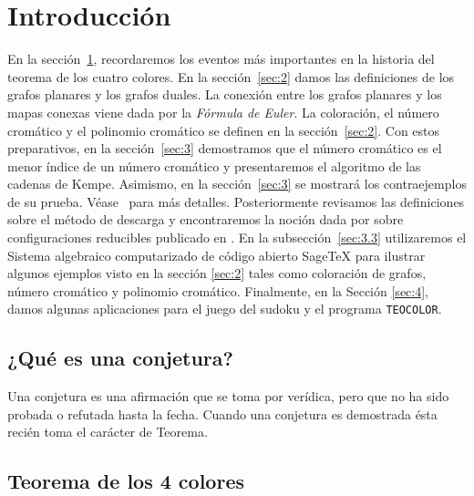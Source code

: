 \documentclass[
	3p,
	times,
	a4paper,
	authoryear
]{elsarticle}%
\begin{document}
\tableofcontents

\section{Introducción}\label{sec:1}

En la sección~\ref{sec:1}, recordaremos los eventos más importantes en la historia del teorema de los cuatro colores. En la sección~\ref{sec:2} damos las definiciones de los grafos planares y los grafos duales. La conexión entre los grafos planares y los mapas conexas viene dada por la \emph{Fórmula de Euler}. La coloración, el número cromático y el polinomio cromático se definen en la sección~\ref{sec:2}. Con estos preparativos, en la sección~\ref{sec:3} demostramos que el número cromático es el menor índice de un número cromático y presentaremos el algoritmo de las cadenas de Kempe. Asimismo, en la sección~\ref{sec:3} se mostrará los contraejemplos de su prueba. Véase~\cite{errera} para más detalles. Posteriormente revisamos las definiciones sobre el método de descarga y encontraremos la noción dada por \citeauthor{birkhoff} sobre configuraciones reducibles publicado en \cite{birkhoff}. En la subsección~\ref{sec:3.3} utilizaremos el Sistema algebraico computarizado de código abierto Sage\TeX{} para ilustrar algunos ejemplos visto en la sección \ref{sec:2} tales como coloración de grafos, número cromático y polinomio cromático. Finalmente, en la Sección \ref{sec:4}, damos algunas aplicaciones para el juego del sudoku y el programa \texttt{TEOCOLOR}.


\subsection{¿Qué es una conjetura?}\label{sec:1.1}
Una conjetura es una afirmación que se toma por verídica, pero que no ha sido probada o refutada hasta la fecha. Cuando una conjetura es demostrada ésta recién toma el carácter de Teorema.

\subsection{Teorema de  los 4 colores}\label{sec:1.2}
\end{document}
